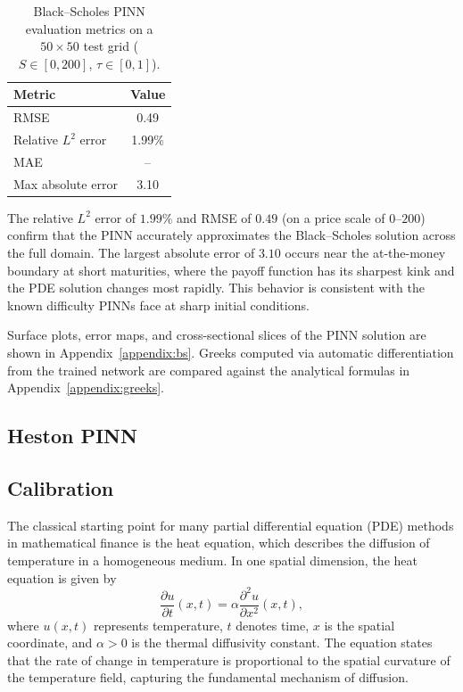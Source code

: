 \begin{table}[h]
\centering
\caption{Black--Scholes PINN evaluation metrics on a $50\times50$ test grid ($S \in [0,200]$, $\tau \in [0,1]$).}\label{table:bs_metrics}
\begin{tabular}{lS[table-format=1.4]}
\toprule
Metric & {Value} \\
\midrule
RMSE                  & 0.49 \\
Relative $L^2$ error  & 1.99\% \\
MAE                   & -- \\
Max absolute error    & 3.10 \\
\bottomrule
\end{tabular}
\end{table}

The relative $L^2$ error of $1.99\%$ and RMSE of $0.49$ (on a price scale of $0$--$200$) confirm that the PINN accurately approximates the Black--Scholes solution across the full domain. The largest absolute error of $3.10$ occurs near the at-the-money boundary at short maturities, where the payoff function has its sharpest kink and the PDE solution changes most rapidly. This behavior is consistent with the known difficulty PINNs face at sharp initial conditions.

Surface plots, error maps, and cross-sectional slices of the PINN solution are shown in Appendix~\ref{appendix:bs}. Greeks computed via automatic differentiation from the trained network are compared against the analytical formulas in Appendix~\ref{appendix:greeks}.

\subsection{Heston PINN}\label{subsection:result_heston}


\subsection{Calibration}\label{subsection:result_calibration}






The classical starting point for many partial differential equation (PDE) methods in mathematical finance is the heat equation, which describes the diffusion of temperature in a homogeneous medium. In one spatial dimension, the heat equation is given by
\[
\frac{\partial u}{\partial t}(x,t)
=
\alpha
\frac{\partial^2 u}{\partial x^2}(x,t),
\]
where $u(x,t)$ represents temperature, $t$ denotes time, $x$ is the spatial coordinate, and $\alpha > 0$ is the thermal diffusivity constant. The equation states that the rate of change in temperature is proportional to the spatial curvature of the temperature field, capturing the fundamental mechanism of diffusion.

